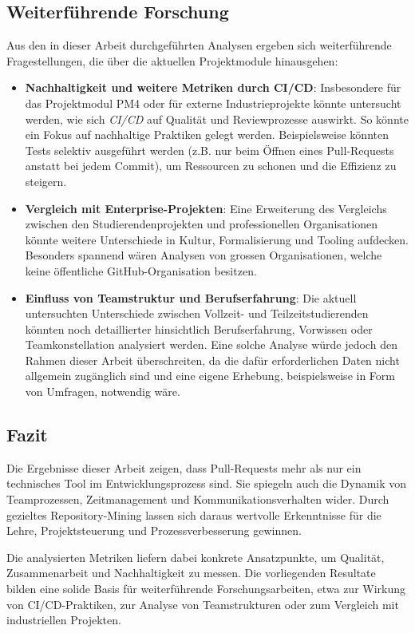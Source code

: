 \subsection{Weiterführende Forschung}
Aus den in dieser Arbeit durchgeführten Analysen ergeben sich weiterführende Fragestellungen, die über die aktuellen Projektmodule hinausgehen:
\begin{itemize}
\item \textbf{Nachhaltigkeit und weitere Metriken durch CI/CD}: Insbesondere für das Projektmodul PM4 oder für externe Industrieprojekte könnte untersucht werden, wie sich \textit{CI/CD} auf Qualität und Reviewprozesse auswirkt. So könnte ein Fokus auf nachhaltige Praktiken gelegt werden. Beispielsweise könnten Tests selektiv ausgeführt werden (z.B. nur beim Öffnen eines Pull-Requests anstatt bei jedem Commit), um Ressourcen zu schonen und die Effizienz zu steigern.
\item \textbf{Vergleich mit Enterprise-Projekten}: Eine Erweiterung des Vergleichs zwischen den Studierendenprojekten und professionellen Organisationen könnte weitere Unterschiede in Kultur, Formalisierung und Tooling aufdecken. Besonders spannend wären Analysen von grossen Organisationen, welche keine öffentliche GitHub-Organisation besitzen.
\item \textbf{Einfluss von Teamstruktur und Berufserfahrung}: Die aktuell untersuchten Unterschiede zwischen Vollzeit- und Teilzeitstudierenden könnten noch detaillierter hinsichtlich Berufserfahrung, Vorwissen oder Teamkonstellation analysiert werden. Eine solche Analyse würde jedoch den Rahmen dieser Arbeit überschreiten, da die dafür erforderlichen Daten nicht allgemein zugänglich sind und eine eigene Erhebung, beispielsweise in Form von Umfragen, notwendig wäre.
\end{itemize}


\subsection{Fazit}

Die Ergebnisse dieser Arbeit zeigen, dass Pull-Requests mehr als nur ein technisches Tool im Entwicklungsprozess sind. Sie spiegeln auch die Dynamik von Teamprozessen, Zeitmanagement und Kommunikationsverhalten wider. Durch gezieltes Repository-Mining lassen sich daraus wertvolle Erkenntnisse für die Lehre, Projektsteuerung und Prozessverbesserung gewinnen.

Die analysierten Metriken liefern dabei konkrete Ansatzpunkte, um Qualität, Zusammenarbeit und Nachhaltigkeit zu messen.
Die vorliegenden Resultate bilden eine solide Basis für weiterführende Forschungsarbeiten, etwa zur Wirkung von CI/CD-Praktiken, zur Analyse von Teamstrukturen oder zum Vergleich mit industriellen Projekten.